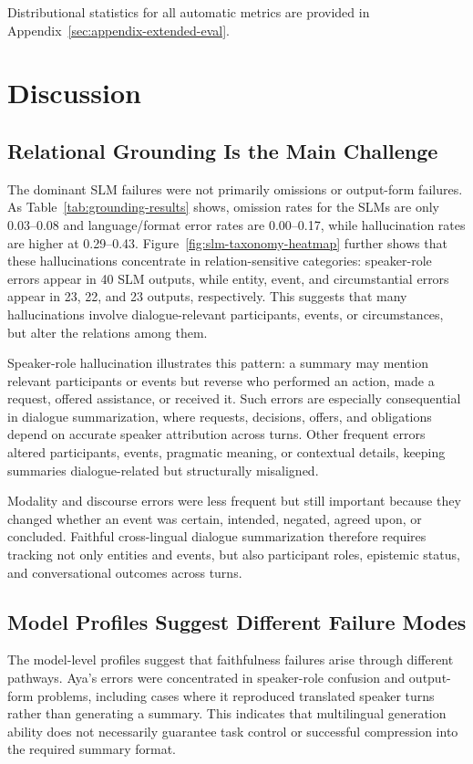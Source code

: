 \documentclass[11pt]{article}
\begin{document}
Distributional statistics for all automatic metrics are provided in Appendix~\ref{sec:appendix-extended-eval}.

\section{Discussion}

\subsection{Relational Grounding Is the Main Challenge}

The dominant SLM failures were not primarily omissions or output-form failures. As Table~\ref{tab:grounding-results} shows, omission rates for the SLMs are only 0.03--0.08 and language/format error rates are 0.00--0.17, while hallucination rates are higher at 0.29--0.43. Figure~\ref{fig:slm-taxonomy-heatmap} further shows that these hallucinations concentrate in relation-sensitive categories: speaker-role errors appear in 40 SLM outputs, while entity, event, and circumstantial errors appear in 23, 22, and 23 outputs, respectively. This suggests that many hallucinations involve dialogue-relevant participants, events, or circumstances, but alter the relations among them.

Speaker-role hallucination illustrates this pattern: a summary may mention relevant participants or events but reverse who performed an action, made a request, offered assistance, or received it. Such errors are especially consequential in dialogue summarization, where requests, decisions, offers, and obligations depend on accurate speaker attribution across turns. Other frequent errors altered participants, events, pragmatic meaning, or contextual details, keeping summaries dialogue-related but structurally misaligned.

Modality and discourse errors were less frequent but still important because they changed whether an event was certain, intended, negated, agreed upon, or concluded. Faithful cross-lingual dialogue summarization therefore requires tracking not only entities and events, but also participant roles, epistemic status, and conversational outcomes across turns.


\subsection{Model Profiles Suggest Different Failure Modes}

The model-level profiles suggest that faithfulness failures arise through different pathways. Aya's errors were concentrated in speaker-role confusion and output-form problems, including cases where it reproduced translated speaker turns rather than generating a summary. This indicates that multilingual generation ability does not necessarily guarantee task control or successful compression into the required summary format.
\end{document}
